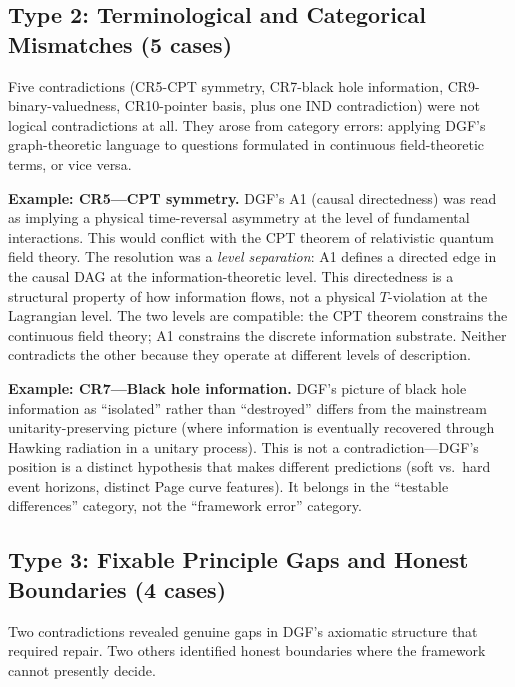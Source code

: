 \documentclass[12pt,a4paper]{article}
\theoremstyle{definition}
\theoremstyle{remark}
\begin{document}
\subsection{Type 2: Terminological and Categorical Mismatches (5 cases)}

Five contradictions (CR5-CPT symmetry, CR7-black hole information, CR9-binary-valuedness, CR10-pointer basis, plus one IND contradiction) were not logical contradictions at all. They arose from category errors: applying DGF's graph-theoretic language to questions formulated in continuous field-theoretic terms, or vice versa.

\textbf{Example: CR5---CPT symmetry.} DGF's A1 (causal directedness) was read as implying a physical time-reversal asymmetry at the level of fundamental interactions. This would conflict with the CPT theorem of relativistic quantum field theory. The resolution was a \emph{level separation}: A1 defines a directed edge in the causal DAG at the information-theoretic level. This directedness is a structural property of how information flows, not a physical $T$-violation at the Lagrangian level. The two levels are compatible: the CPT theorem constrains the continuous field theory; A1 constrains the discrete information substrate. Neither contradicts the other because they operate at different levels of description.

\textbf{Example: CR7---Black hole information.} DGF's picture of black hole information as ``isolated'' rather than ``destroyed'' differs from the mainstream unitarity-preserving picture (where information is eventually recovered through Hawking radiation in a unitary process). This is not a contradiction---DGF's position is a distinct hypothesis that makes different predictions (soft vs.\ hard event horizons, distinct Page curve features). It belongs in the ``testable differences'' category, not the ``framework error'' category.

\subsection{Type 3: Fixable Principle Gaps and Honest Boundaries (4 cases)}

Two contradictions revealed genuine gaps in DGF's axiomatic structure that required repair. Two others identified honest boundaries where the framework cannot presently decide.
\end{document}
